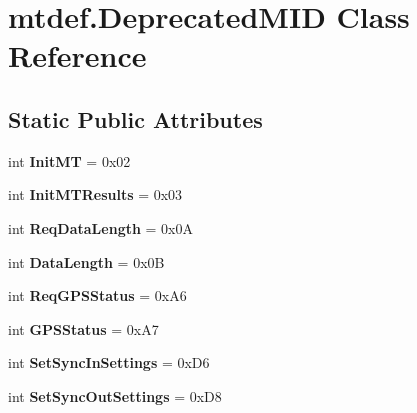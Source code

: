 \hypertarget{classmtdef_1_1DeprecatedMID}{}\section{mtdef.\+Deprecated\+M\+ID Class Reference}
\label{classmtdef_1_1DeprecatedMID}
\subsection*{Static Public Attributes}
\begin{DoxyCompactItemize}
\item 
\mbox{\label{classmtdef_1_1DeprecatedMID_a81f218692edadece8719f387f1b052c4}} 
int {\bfseries Init\+MT} = 0x02
\item 
\mbox{\label{classmtdef_1_1DeprecatedMID_a04dbf68dfac7605603301e2543e979d6}} 
int {\bfseries Init\+M\+T\+Results} = 0x03
\item 
\mbox{\label{classmtdef_1_1DeprecatedMID_a3f7ea58fbdaa107e85bb4346077f77c6}} 
int {\bfseries Req\+Data\+Length} = 0x0A
\item 
\mbox{\label{classmtdef_1_1DeprecatedMID_a1f84b0b45629ab4fe1bea6254b8cc510}} 
int {\bfseries Data\+Length} = 0x0B
\item 
\mbox{\label{classmtdef_1_1DeprecatedMID_a45521522a75d20365bab79113cc1c653}} 
int {\bfseries Req\+G\+P\+S\+Status} = 0x\+A6
\item 
\mbox{\label{classmtdef_1_1DeprecatedMID_accd6581d6c16fc3bd3391f050454329a}} 
int {\bfseries G\+P\+S\+Status} = 0x\+A7
\item 
\mbox{\label{classmtdef_1_1DeprecatedMID_a563024426a8966669e7f72739bfe04d7}} 
int {\bfseries Set\+Sync\+In\+Settings} = 0x\+D6
\item 
\mbox{\label{classmtdef_1_1DeprecatedMID_a19f16db2e567e12cf99e5379051e5cd5}} 
int {\bfseries Set\+Sync\+Out\+Settings} = 0x\+D8
\item 

\end{DoxyCompactItemize}
